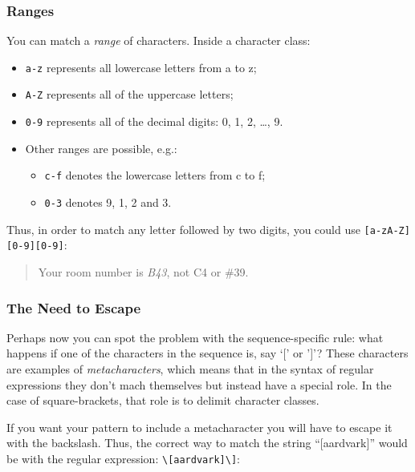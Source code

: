 \documentclass[]{book}
\providecommand{\tightlist}{%
  \setlength{\itemsep}{0pt}\setlength{\parskip}{0pt}}
\theoremstyle{definition}
\theoremstyle{definition}
\theoremstyle{remark}
\begin{document}
{\subsubsection{Ranges}\label{ranges}

You can match a \emph{range}  of characters.
Inside a character class:

\begin{itemize}
\tightlist
\item
  \texttt{a-z} represents all lowercase letters from a to z;
\item
  \texttt{A-Z} represents all of the uppercase letters;
\item
  \texttt{0-9} represents all of the decimal digits: 0, 1, 2, \ldots{},
  9.
\item
  Other ranges are possible, e.g.:

  \begin{itemize}
  \tightlist
  \item
    \texttt{c-f} denotes the lowercase letters from c to f;
  \item
    \texttt{0-3} denotes 9, 1, 2 and 3.
  \end{itemize}
\end{itemize}

Thus, in order to match any letter followed by two digits, you could use
\texttt{{[}a-zA-Z{]}{[}0-9{]}{[}0-9{]}}:

\begin{quote}
Your room number is \emph{B43}, not C4 or \#39.
\end{quote}

\subsubsection{The Need to Escape}\label{the-need-to-escape}

Perhaps now you can spot the problem with the sequence-specific rule:
what happens if one of the characters in the sequence is, say `{[}' or
'{]}'? These characters are examples of \emph{metacharacters},
 which means that in the syntax of regular
expressions they don't mach themselves but instead have a special role.
In the case of square-brackets, that role is to delimit character
classes.

If you want your pattern to include a metacharacter you will have to
escape it with the backslash. Thus, the correct way to match the string
``{[}aardvark{]}'' would be with the regular expression:
\texttt{\textbackslash{}{[}aardvark{]}\textbackslash{}{]}}:

}
\end{document}
